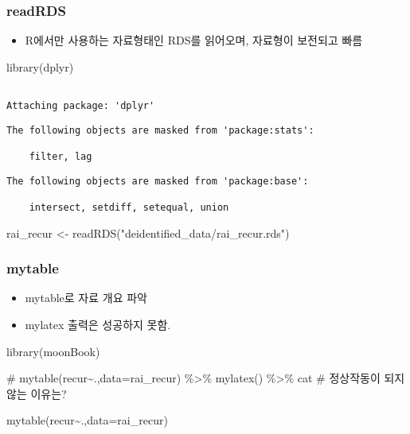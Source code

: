 \documentclass[
  letterpaper,
  DIV=11,
  numbers=noendperiod]{scrartcl}
\newenvironment{Shaded}{\begin{snugshade}}{\end{snugshade}}
\newcommand{\AttributeTok}[1]{\textcolor[rgb]{0.40,0.45,0.13}{#1}}
\newcommand{\CommentTok}[1]{\textcolor[rgb]{0.37,0.37,0.37}{#1}}
\newcommand{\FunctionTok}[1]{\textcolor[rgb]{0.28,0.35,0.67}{#1}}
\newcommand{\NormalTok}[1]{\textcolor[rgb]{0.00,0.23,0.31}{#1}}
\newcommand{\OtherTok}[1]{\textcolor[rgb]{0.00,0.23,0.31}{#1}}
\newcommand{\SpecialCharTok}[1]{\textcolor[rgb]{0.37,0.37,0.37}{#1}}
\newcommand{\StringTok}[1]{\textcolor[rgb]{0.13,0.47,0.30}{#1}}
\providecommand{\tightlist}{%
  \setlength{\itemsep}{0pt}\setlength{\parskip}{0pt}}\usepackage{longtable,booktabs,array}
\begin{document}
\subsubsection{readRDS}\label{readrds}

\begin{itemize}
\tightlist
\item
  R에서만 사용하는 자료형태인 RDS를 읽어오며, 자료형이 보전되고 빠름
\end{itemize}

\begin{Shaded}
\begin{Highlighting}[]
\FunctionTok{library}\NormalTok{(dplyr)}
\end{Highlighting}
\end{Shaded}

\begin{verbatim}

Attaching package: 'dplyr'
\end{verbatim}

\begin{verbatim}
The following objects are masked from 'package:stats':

    filter, lag
\end{verbatim}

\begin{verbatim}
The following objects are masked from 'package:base':

    intersect, setdiff, setequal, union
\end{verbatim}

\begin{Shaded}
\begin{Highlighting}[]
\NormalTok{rai\_recur }\OtherTok{\textless{}{-}} \FunctionTok{readRDS}\NormalTok{(}\StringTok{"deidentified\_data/rai\_recur.rds"}\NormalTok{)}
\end{Highlighting}
\end{Shaded}

\subsubsection{mytable}\label{mytable}

\begin{itemize}
\tightlist
\item
  mytable로 자료 개요 파악
\item
  mylatex 출력은 성공하지 못함.
\end{itemize}

\begin{Shaded}
\begin{Highlighting}[]
\FunctionTok{library}\NormalTok{(moonBook)}

\CommentTok{\# mytable(recur\textasciitilde{}.,data=rai\_recur) \%\textgreater{}\% mylatex() \%\textgreater{}\% cat \# 정상작동이 되지 않는 이유는?}

\FunctionTok{mytable}\NormalTok{(recur}\SpecialCharTok{\textasciitilde{}}\NormalTok{.,}\AttributeTok{data=}\NormalTok{rai\_recur)}
\end{Highlighting}
\end{Shaded}
\end{document}

